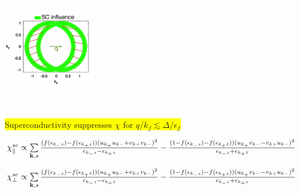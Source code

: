 \documentclass{beamer}
\newcommand\Fontvi{\fontsize{9}{9}\selectfont}
\newcommand\Fontv{\fontsize{11}{11}\selectfont}
\begin{document}
\begin{frame}
\begin{columns}
\begin{column}{0.77\textwidth}
      \includegraphics[height=0.3\textwidth, width=0.3\textwidth]{sc_effect1.jpg}   
    \end{column}
  \end{columns}
  \centering
  \colorbox{yellow}{Superconductivity suppresses $\chi$ for $q/k_f\lesssim\Delta/\epsilon_f$}
\begin{center}
{ \Fontv$\chi^{sc}_{\parallel}\propto\sum\limits_{{\bf k},s} \frac{(f(\epsilon_{k_-s})-f(\epsilon_{k_+s}))(u_{k_+}u_{k-}+v_{k+}v_{k-})^2}{\epsilon_{k_-s}-\epsilon_{k_+s}}-\frac{(1-f(\epsilon_{k_-s})-f(\epsilon_{k_+\bar{s}}))(u_{k_+}v_{k-}-v_{k+}u_{k-})^2}{\epsilon_{k_-s}+\epsilon_{k_+\bar{s}}}$}
\end{center}

\begin{center}
{\Fontv $\chi^{sc}_{\perp}\propto\sum\limits_{{\bf k},s} \frac{(f(\epsilon_{k_-s})-f(\epsilon_{k_+\bar{s}}))(u_{k_+}u_{k-}+v_{k+}v_{k-})^2}{\epsilon_{k_-s}-\epsilon_{k_+\bar{s}}} -\frac{(1-f(\epsilon_{k_-s})-f(\epsilon_{k_+s}))(u_{k_+}v_{k-}-v_{k+}u_{k-})^2}{\epsilon_{k_-s}+\epsilon_{k_+s}}$} \\
\end{center}

\end{frame}
\end{document}
